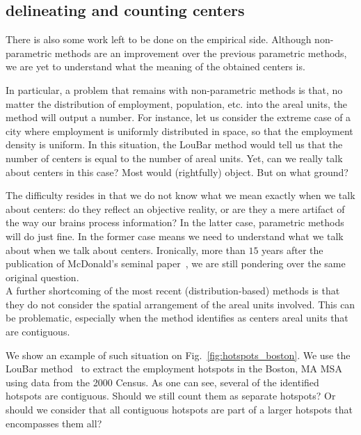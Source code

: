 \subsection{delineating and counting centers}
\label{sub:measuring_the_number_of_centers}

There is also some work left to be done on the empirical side. Although
non-parametric methods are an improvement over the previous parametric methods,
we are yet to understand what the meaning of the obtained centers is. 


In particular, a problem that remains with non-parametric methods is that, no
matter the distribution of employment, population, etc. into the areal units,
the method will output a number. For instance, let us consider the extreme case
of a city where employment is uniformly distributed in space, so that the
employment density is uniform. In this situation, the LouBar method would tell
us that the number of centers is equal to the number of areal units. Yet, can we
really talk about centers in this case? Most would (rightfully) object. But on
what ground?

The difficulty resides in that we do not know what we mean exactly when we talk
about centers: do they reflect an objective reality, or are they a mere artifact
of the way our brains process information? In the latter case, parametric
methods will do just fine. In the former case means we need to understand
what we talk about when we talk about centers. Ironically, more than $15$ years
after the publication of McDonald's seminal paper~\cite{McDonal:1987}, we are
still pondering over the same original question.\\


A further shortcoming of the most recent (distribution-based) methods is that
they do not consider the spatial arrangement of the areal units involved. This
can be problematic, especially when the method identifies as centers areal units
that are contiguous. 

We show an example of such situation on Fig.~\ref{fig:hotspots_boston}. We use
the LouBar method~\cite{Louail:2014} to extract the employment hotspots in the
Boston, MA MSA using data from the 2000 Census. As one can see, several of the
identified hotspots are contiguous. Should we still count them as separate
hotspots? Or should we consider that all contiguous hotspots are part of a
larger hotspots that encompasses them all? 

